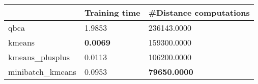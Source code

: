 \begin{table}[htbp]
\centering
\begin{tabular}{lll}
\toprule
 & Training time & #Distance computations \\
\midrule
qbca & 1.9853 & 236143.0000 \\
kmeans & \textbf{0.0069} & 159300.0000 \\
kmeans_plusplus & 0.0113 & 106200.0000 \\
minibatch_kmeans & 0.0953 & \textbf{79650.0000} \\
\bottomrule
\end{tabular}
\end{table}
